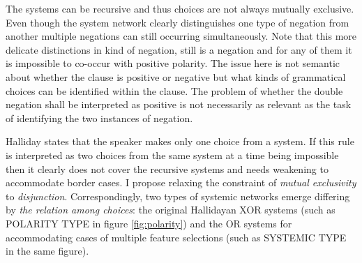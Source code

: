 The systems can be recursive and thus choices are not always mutually exclusive. Even though the system network  clearly distinguishes one type of negation from another multiple negations can still occurring simultaneously. Note that this more delicate distinctions in kind of negation, still is a negation and for any of them it is impossible to co-occur with positive polarity. 
The issue here is not semantic about whether the clause is positive or negative but what kinds of grammatical choices can be identified within the clause. The problem of whether the double negation shall be interpreted as positive is not necessarily as relevant as the task of identifying the two instances of negation. 

Halliday states that the speaker makes only one choice from a system. If this rule is interpreted as two choices from the same system at a time being impossible then it clearly does not cover the recursive systems and needs weakening to accommodate border cases. I propose relaxing the constraint of \textit{mutual exclusivity} to \textit{disjunction}. Correspondingly, two types of systemic networks emerge differing by \textit{the relation among choices}: the original Hallidayan XOR systems (such as POLARITY TYPE in figure \ref{fig:polarity}) and the OR systems for accommodating cases of multiple feature selections (such as SYSTEMIC TYPE in the same figure).

